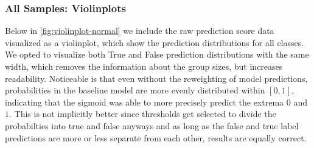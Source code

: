\subsubsection{All Samples: Violinplots}
Below in \autoref{fig:violinplot-normal} we include the raw prediction score data visualized as a violinplot, which show the prediction distributions for all classes. We opted to visualize both True and False prediction distributions with the same width, which removes the information about the group sizes, but increases readability. Noticeable is that even without the reweighting of model predictions, probabilities in the baseline model are more evenly distributed within $[0,1]$, indicating that the sigmoid was able to more precisely predict the extrema $0$ and $1$. This is not implicitly better since thresholds get selected to divide the probabilties into true and false anyways and as long as the false and true label predictions are more or less separate from each other, results are equally correct.
%	
